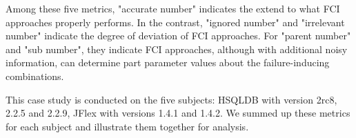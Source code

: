 \documentclass{sig-alternate}
\begin{document}
Among these five metrics,  "accurate number" indicates the extend to what FCI approaches properly performs. In the contrast, "ignored number" and "irrelevant number" indicate the degree of deviation of FCI approaches. For "parent number" and "sub number", they indicate FCI approaches, although with additional noisy information, can determine part parameter values about the failure-inducing combinations.


This case study is conducted on the five subjects: HSQLDB with version 2rc8, 2.2.5 and 2.2.9, JFlex with versions 1.4.1 and 1.4.2. We summed up these metrics for each subject and illustrate them together for analysis.


%
%
%
%
%
%
%
%
\end{document}
